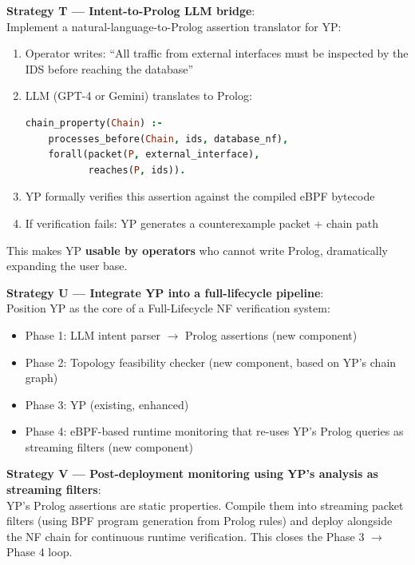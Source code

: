 \begin{strategybox}
\textbf{Strategy T --- Intent-to-Prolog LLM bridge}:\\
Implement a natural-language-to-Prolog assertion translator for YP:
\begin{enumerate}
  \item Operator writes: ``All traffic from external interfaces must be inspected by the IDS before reaching the database''
  \item LLM (GPT-4 or Gemini) translates to Prolog:
  \begin{lstlisting}[language=Prolog]
chain_property(Chain) :-
    processes_before(Chain, ids, database_nf),
    forall(packet(P, external_interface), 
           reaches(P, ids)).
  \end{lstlisting}
  \item YP formally verifies this assertion against the compiled eBPF bytecode
  \item If verification fails: YP generates a counterexample packet + chain path
\end{enumerate}
This makes YP \textbf{usable by operators} who cannot write Prolog, dramatically expanding the user base.

\textbf{Strategy U --- Integrate YP into a full-lifecycle pipeline}:\\
Position YP as the core of a Full-Lifecycle NF verification system:
\begin{itemize}
  \item Phase 1: LLM intent parser $\to$ Prolog assertions (new component)
  \item Phase 2: Topology feasibility checker (new component, based on YP's chain graph)
  \item Phase 3: YP (existing, enhanced)
  \item Phase 4: eBPF-based runtime monitoring that re-uses YP's Prolog queries as streaming filters (new component)
\end{itemize}

\textbf{Strategy V --- Post-deployment monitoring using YP's analysis as streaming filters}:\\
YP's Prolog assertions are static properties. Compile them into streaming packet filters (using BPF program generation from Prolog rules) and deploy alongside the NF chain for continuous runtime verification. This closes the Phase 3 $\to$ Phase 4 loop.
\end{strategybox}

